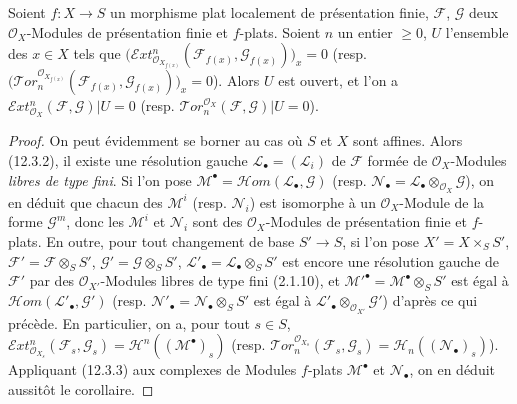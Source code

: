 \begin{corollary}[12.3.4]
\label{IV.12.3.4-fr}
Soient $f:X\to S$ un morphisme plat localement de présentation finie,
$\mathcal F$, $\mathcal G$ deux $\mathcal O_X$-Modules de présentation finie et
$f$-plats. Soient $n$ un entier $\geq0$, $U$ l'ensemble des $x\in X$ tels que
$\bigl(\mathscr{E}\!xt^n_{\mathcal O_{X_{f(x)}}}
(\mathcal F_{f(x)},\mathcal G_{f(x)})\bigr)_x=0$
\textup{(resp.
$\bigl(\mathscr{T}\!or_n^{\mathcal O_{X_{f(x)}}}
(\mathcal F_{f(x)},\mathcal G_{f(x)})\bigr)_x=0$)}. Alors $U$ est ouvert, et
l'on a
$\mathscr{E}\!xt^n_{\mathcal O_X}(\mathcal F,\mathcal G)|U=0$
\textup{(resp.
$\mathscr{T}\!or_n^{\mathcal O_X}(\mathcal F,\mathcal G)|U=0$)}.
\end{corollary}

\begin{proof}
On peut évidemment se borner au cas où $S$ et $X$ sont affines. Alors (12.3.2),
il existe une résolution gauche $\mathcal L_\bullet=(\mathcal L_i)$ de
$\mathcal F$ formée de $\mathcal O_X$-Modules \emph{libres de type fini}. Si
l'on pose $\mathcal M^\bullet=\mathscr{H}\!om(\mathcal L_\bullet,\mathcal G)$
(resp. $\mathcal N_\bullet=\mathcal L_\bullet\otimes_{\mathcal O_X}\mathcal G$),
on en déduit que chacun des $\mathcal M^i$ (resp. $\mathcal N_i$) est isomorphe
à un $\mathcal O_X$-Module de la forme $\mathcal G^m$, donc les $\mathcal M^i$
et $\mathcal N_i$ sont des $\mathcal O_X$-Modules de présentation finie et
$f$-plats. En outre, pour tout changement de base $S'\to S$, si l'on pose
$X'=X\times_SS'$, $\mathcal F'=\mathcal F\otimes_SS'$,
$\mathcal G'=\mathcal G\otimes_SS'$, $\mathcal L'_\bullet
=\mathcal L_\bullet\otimes_SS'$ est encore une
résolution gauche de $\mathcal F'$ par des $\mathcal O_{X'}$-Modules libres de
type fini (2.1.10), et $\mathcal M'^\bullet=\mathcal M^\bullet\otimes_SS'$ est
égal à $\mathscr{H}\!om(\mathcal L'_\bullet,\mathcal G')$ (resp.
$\mathcal N'_\bullet=\mathcal N_\bullet\otimes_SS'$ est égal à
$\mathcal L'_\bullet\otimes_{\mathcal O_{X'}}\mathcal G'$) d'après ce qui
précède. En particulier, on a, pour tout $s\in S$,
$\mathscr{E}\!xt^n_{\mathcal O_{X_s}}(\mathcal F_s,\mathcal G_s)
=\mathcal H^n((\mathcal M^\bullet)_s)$
(resp.
$\mathscr{T}\!or_n^{\mathcal O_{X_s}}(\mathcal F_s,\mathcal G_s)
=\mathcal H_n((\mathcal N_\bullet)_s)$). Appliquant (12.3.3) aux complexes de
Modules $f$-plats $\mathcal M^\bullet$ et $\mathcal N_\bullet$, on en déduit
aussitôt le corollaire.
\end{proof}

